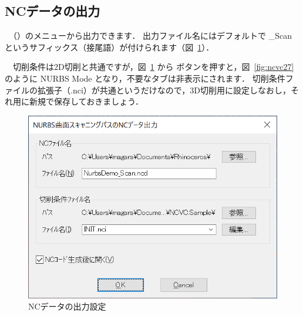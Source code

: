 \subsection{NCデータの出力}
　（）のメニューから出力できます．
出力ファイル名にはデフォルトで \_Scan というサフィックス（接尾語）が付けられます（図~\ref{fig:ncvc26}）．

　切削条件は2D切削と共通ですが，図~\ref{fig:ncvc26} から ボタンを押すと，図~\ref{fig:ncvc27} のように NURBS Mode となり，不要なタブは非表示にされます．
切削条件ファイルの拡張子（.nci）が共通というだけなので，3D切削用に設定しなおし，それ用に新規で保存しておきましょう．

\begin{minipage}{0.5\textwidth}
\begin{figure}[H]
\centering
\includegraphics[scale=0.7]{No2/fig/fig26.png}
\caption{NCデータの出力設定}
\label{fig:ncvc26}
\end{figure}
\end{minipage}
